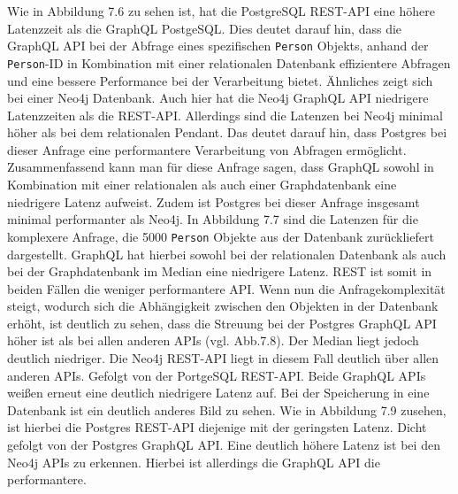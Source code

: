 \noindent
Wie in Abbildung 7.6 zu sehen ist, hat die PostgreSQL REST-API eine höhere Latenzzeit als die GraphQL PostgeSQL. Dies deutet darauf hin, dass die GraphQL API bei der Abfrage eines spezifischen \texttt{Person} Objekts, anhand der \texttt{Person}-ID in Kombination mit einer relationalen Datenbank effizientere Abfragen und eine bessere Performance bei der Verarbeitung bietet. Ähnliches zeigt sich bei einer Neo4j Datenbank. Auch hier hat die Neo4j GraphQL API niedrigere Latenzzeiten als die REST-API. Allerdings sind die Latenzen bei Neo4j minimal höher als bei dem relationalen Pendant. Das deutet darauf hin, dass Postgres bei dieser Anfrage eine performantere Verarbeitung von Abfragen ermöglicht. Zusammenfassend kann man für diese Anfrage sagen, dass GraphQL sowohl in Kombination mit einer relationalen als auch einer Graphdatenbank eine niedrigere Latenz aufweist. Zudem ist Postgres bei dieser Anfrage insgesamt minimal performanter als Neo4j.
\newline
In Abbildung 7.7 sind die Latenzen für die komplexere Anfrage, die 5000 \texttt{Person} Objekte aus der Datenbank zurückliefert dargestellt. GraphQL hat hierbei sowohl bei der relationalen Datenbank als auch bei der Graphdatenbank im Median eine niedrigere Latenz. REST ist somit in beiden Fällen die weniger performantere API.
\newline
Wenn nun die Anfragekomplexität steigt, wodurch sich die Abhängigkeit zwischen den Objekten in der Datenbank erhöht, ist deutlich zu sehen, dass die Streuung bei der Postgres GraphQL API höher ist als bei allen anderen APIs (vgl. Abb.7.8). Der Median liegt jedoch deutlich niedriger. Die Neo4j REST-API liegt in diesem Fall deutlich über allen anderen APIs. Gefolgt von der PortgeSQL REST-API. Beide GraphQL APIs weißen erneut eine deutlich niedrigere Latenz auf.
\newline
Bei der Speicherung in eine Datenbank ist ein deutlich anderes Bild zu sehen. Wie in Abbildung 7.9 zusehen, ist hierbei die Postgres REST-API diejenige mit der geringsten Latenz. Dicht gefolgt von der Postgres GraphQL API. Eine deutlich höhere Latenz ist bei den Neo4j APIs zu erkennen. Hierbei ist allerdings die GraphQL API die performantere.



